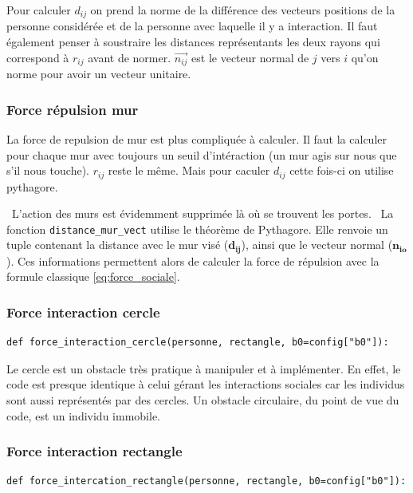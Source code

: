 \documentclass[a4paper,12pt]{article}
\begin{document}
Pour calculer $d_{ij}$ on prend la norme de la différence des vecteurs positions de la personne considérée et de la personne avec laquelle il y a interaction. Il faut également penser à soustraire les distances représentants les deux rayons qui correspond à $r_{ij}$ avant de normer. $\vec{n_{ij}}$ est le vecteur normal de $j$ vers $i$ qu'on norme pour avoir un vecteur unitaire. 


\subsubsection{Force répulsion mur}
La force de repulsion de mur est plus compliquée à calculer. Il faut la calculer pour chaque mur avec toujours un seuil d'intéraction (un mur agis sur nous que s'il nous touche). \textbf{$r_{ij}$} reste le même. Mais pour caculer \textbf{$d_{ij}$} cette fois-ci on utilise pythagore.

\
L'action des murs est évidemment supprimée là où se trouvent les portes.
\
La fonction \texttt{distance\_mur\_vect} utilise le théorème de Pythagore. Elle renvoie un tuple contenant la distance avec le mur visé ($\mathbf{d_{ij}}$), ainsi que le vecteur normal ($\mathbf{n_{io}}$). Ces informations permettent alors de calculer la force de répulsion avec la formule classique \eqref{eq:force_sociale}.

\subsubsection{Force interaction cercle}
\begin{verbatim}
def force_interaction_cercle(personne, rectangle, b0=config["b0"]):
\end{verbatim}

Le cercle est un obstacle très pratique à manipuler et à implémenter. En effet, le code est presque identique à celui gérant les interactions sociales car les individus sont aussi représentés par des cercles. Un obstacle circulaire, du point de vue du code, est un individu immobile.

\subsubsection{Force interaction rectangle}

\begin{verbatim}
def force_intercation_rectangle(personne, rectangle, b0=config["b0"]):
\end{verbatim}
\end{document}
